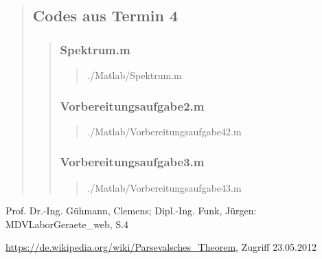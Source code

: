 \begin{quote}
	\subsection{Codes aus Termin 4}
	\begin{quote}
		
		\subsubsection{Spektrum.m}
		\begin{quote}
		
				{./Matlab/Spektrum.m}
		\end{quote}
		
		\subsubsection{Vorbereitungsaufgabe2.m}
		\begin{quote}
		
		        {./Matlab/Vorbereitungsaufgabe42.m}
		\end{quote}
		
		\subsubsection{Vorbereitungsaufgabe3.m}
		\begin{quote}
		
                {./Matlab/Vorbereitungsaufgabe43.m}		
		\end{quote}
		
	\end{quote}
\end{quote}



\begin{thebibliography}{999}
 Prof. Dr.-Ing. Gühmann, Clemens; Dipl.-Ing. Funk, Jürgen: MDVLaborGeraete_web, S.4

 \url{https://de.wikipedia.org/wiki/Parsevalsches_Theorem}, Zugriff
23.05.2012
\end{thebibliography}





